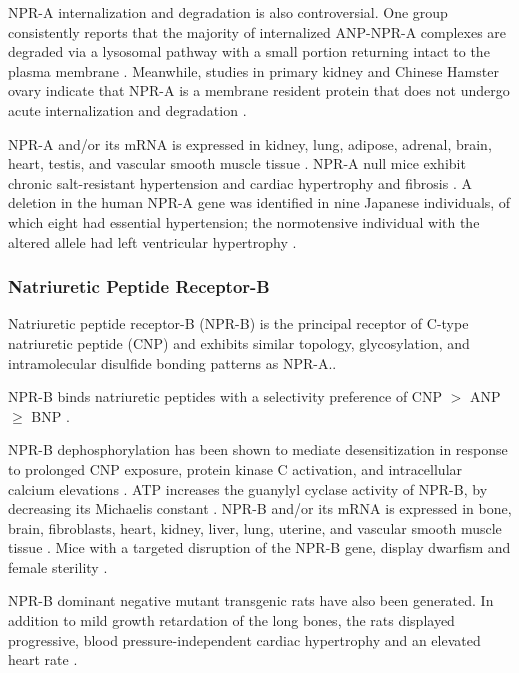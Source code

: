 \documentclass[14pt,a4paper,onecolumn]{extarticle}
\begin{document}
NPR-A internalization and degradation is also controversial. One group consistently reports that the majority of internalized ANP-NPR-A complexes are degraded via a lysosomal pathway with a small portion returning intact to the plasma membrane \citep{Pandey2002}. Meanwhile, studies in primary kidney and Chinese Hamster ovary indicate that NPR-A is a membrane resident protein that does not undergo acute internalization and degradation \citep{Fan2005} \citep{Vieira2001}.

NPR-A and/or its mRNA is expressed in kidney, lung, adipose, adrenal, brain, heart, testis, and vascular smooth muscle tissue \citep{Goy2001}. NPR-A null mice exhibit chronic salt-resistant hypertension and cardiac hypertrophy and fibrosis \citep{Kuhn2002}.  A deletion in the human NPR-A gene was identified in nine Japanese individuals, of which eight had essential hypertension; the normotensive individual with the altered allele had left ventricular hypertrophy \citep{Nakayama2000}.  %

\subsubsection{Natriuretic Peptide Receptor-B}
Natriuretic peptide receptor-B (NPR-B) is the principal receptor of C-type natriuretic peptide (CNP) and exhibits similar topology, glycosylation, and intramolecular disulfide bonding patterns as NPR-A.\citep{Schulz1989}.

NPR-B binds natriuretic peptides with a selectivity preference of CNP $>$ ANP $\ge$ BNP \citep{Bennett1991} \citep{Koller1991} \citep{Suga1992a}.

NPR-B dephosphorylation has been shown to mediate desensitization in response to prolonged CNP exposure, protein kinase C activation, and intracellular calcium elevations \citep{Potter2000} \citep{Potthast2004}. ATP increases the guanylyl cyclase activity of NPR-B, by decreasing its Michaelis constant \citep{Antos2007}. NPR-B and/or its mRNA is expressed in bone, brain, fibroblasts, heart, kidney, liver, lung, uterine, and vascular smooth muscle tissue \citep{Bryan2006} \citep{Dickey2007}. Mice with a targeted disruption of the NPR-B gene, display dwarfism and  female sterility \citep{Tamura2004}.

NPR-B dominant negative mutant transgenic rats have also been generated. In addition to mild growth retardation of the long bones, the rats displayed progressive, blood pressure-independent cardiac hypertrophy and an elevated heart rate \citep{Langenickel2006}.
\end{document}
